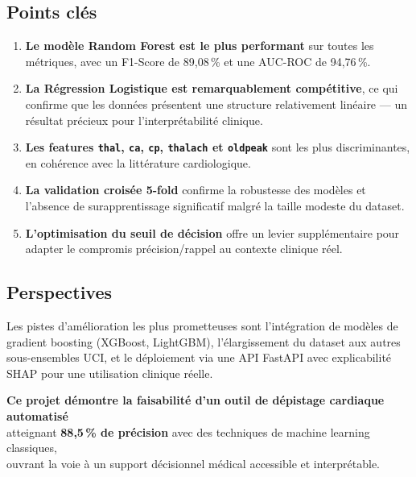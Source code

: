 \documentclass[12pt,a4paper]{article}
\newcommand{\feat}[1]{\texttt{\textcolor{medblue}{#1}}}
\begin{document}
		\subsection{Points clés}
		
		\begin{enumerate}
			\item \textbf{Le modèle Random Forest est le plus performant} sur toutes les métriques, avec un F1-Score de 89{,}08\,\% et une AUC-ROC de 94{,}76\,\%.
			
			\item \textbf{La Régression Logistique est remarquablement compétitive}, ce qui confirme que les données présentent une structure relativement linéaire — un résultat précieux pour l'interprétabilité clinique.
			
			\item \textbf{Les features \feat{thal}, \feat{ca}, \feat{cp}, \feat{thalach} et \feat{oldpeak}} sont les plus discriminantes, en cohérence avec la littérature cardiologique.
			
			\item \textbf{La validation croisée 5-fold} confirme la robustesse des modèles et l'absence de surapprentissage significatif malgré la taille modeste du dataset.
			
			\item \textbf{L'optimisation du seuil de décision} offre un levier supplémentaire pour adapter le compromis précision/rappel au contexte clinique réel.
		\end{enumerate}
		
		\subsection{Perspectives}
		
		Les pistes d'amélioration les plus prometteuses sont l'intégration de modèles de gradient boosting (XGBoost, LightGBM), l'élargissement du dataset aux autres sous-ensembles UCI, et le déploiement via une API FastAPI avec explicabilité SHAP pour une utilisation clinique réelle.
		
		\vspace{1cm}
		\begin{tcolorbox}[resultbox]
			\centering
			\textbf{Ce projet démontre la faisabilité d'un outil de dépistage cardiaque automatisé} \\
			atteignant \textbf{88,5\,\% de précision} avec des techniques de machine learning classiques,\\
			ouvrant la voie à un support décisionnel médical accessible et interprétable.
		\end{tcolorbox}
		
\end{document}
